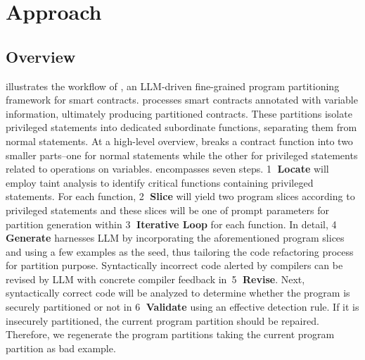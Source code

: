 
\section{Approach}
\label{sec:approach}



\subsection{Overview}
 illustrates the workflow of \tool, an LLM-driven fine-grained program partitioning framework for smart contracts. \tool processes smart contracts annotated with \secrete variable information, ultimately producing partitioned contracts. These partitions isolate privileged statements into dedicated subordinate functions, separating them from normal statements.
At a high-level overview,
\tool breaks a contract function into two smaller parts--one for normal statements while the other for privileged statements related to operations on \secrete variables.
\tool encompasses seven steps.
\textcircled{1} \textbf{Locate} will employ taint analysis to identify critical functions containing privileged statements.
For each function, 
\textcircled{2} \textbf{Slice} will yield two program slices according to privileged statements and these slices will be one of prompt parameters for partition generation within \textcircled{3} \textbf{Iterative Loop} for each function.
In detail, \textcircled{4} \textbf{Generate} harnesses LLM by incorporating the aforementioned program slices and using a few  examples as the seed, thus tailoring the code refactoring process for partition purpose. 
Syntactically incorrect code alerted by compilers can be revised by LLM with concrete compiler feedback in~\textcircled{5} \textbf{Revise}.
Next, syntactically correct code will be analyzed to determine whether the program is securely partitioned or not in \textcircled{6} \textbf{Validate} using an effective detection rule.
If it is insecurely partitioned, the current program partition should be repaired.
Therefore, we regenerate the program partitions taking the current program partition as bad example.
